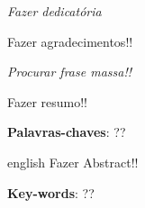 \documentclass[
	12pt,				%
    oneside,			%
	a4paper,			%
	chapter=TITLE,		%
	english,			%
	brazil				%
	]{abntex2}
\begin{document}
\frenchspacing 


\imprimircapa

\imprimirfolhaderosto

\imprimirfolhadeaprovacao
\begin{dedicatoria}
   \vspace*{\fill}
   \centering
   \noindent
   \textit{Fazer dedicatória} \vspace*{\fill}
\end{dedicatoria}

\begin{agradecimentos}
Fazer agradecimentos!!

\end{agradecimentos}

\begin{epigrafe}
    \vspace*{\fill}
	\begin{flushright}
		\textit{Procurar frase massa!!}
	\end{flushright}
\end{epigrafe}


\setlength{\absparsep}{18pt} %
\begin{resumo}
Fazer resumo!!

 \vspace{\onelineskip}
 
 \noindent 
 \textbf{Palavras-chaves}: ??
\end{resumo}

\begin{resumo}[Abstract]
 \begin{otherlanguage*}{english}
   Fazer Abstract!!

   \vspace{\onelineskip}
 
   \noindent 
   \textbf{Key-words}: ??
 \end{otherlanguage*}
\end{resumo}
\listoffigures*
\cleardoublepage
\end{document}
